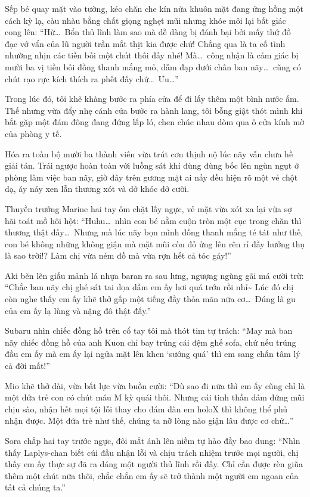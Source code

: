\documentclass[../main.tex]{subfiles}
\begin{document}
Sếp bé quay mặt vào tường, kéo chăn che kín nửa khuôn mặt đang ửng hồng một cách kỳ lạ, càu nhàu bằng chất giọng nghẹt mũi nhưng khóe môi lại bất giác cong lên: ``Hừ\dots\ Bổn thủ lĩnh làm sao mà dễ dàng bị đánh bại bởi mấy thứ đồ đạc vớ vẩn của lũ người trần mắt thịt kia được chứ! Chẳng qua là ta cố tình nhường nhịn các tiền bối một chút thôi đấy nhé! Mà\dots\ công nhận là cảm giác bị mười ba vị tiền bối đồng thanh mắng mỏ, dẫm đạp dưới chân ban nãy\dots\ cũng có chút rạo rực kích thích ra phết đấy chứ\dots\ Ưu\dots''

Trong lúc đó, tôi khẽ khàng bước ra phía cửa để đi lấy thêm một bình nước ấm. Thế nhưng vừa đẩy nhẹ cánh cửa bước ra hành lang, tôi bỗng giật thót mình khi bắt gặp một đám đông đang đứng lấp ló, chen chúc nhau dòm qua ô cửa kính mờ của phòng y tế.

Hóa ra toàn bộ mười ba thành viên vừa trút cơn thịnh nộ lúc nãy vẫn chưa hề giải tán. Trái ngược hoàn toàn với luồng sát khí đùng đùng bốc lên ngùn ngụt ở phòng làm việc ban nãy, giờ đây trên gương mặt ai nấy đều hiện rõ một vẻ chột dạ, áy náy xen lẫn thương xót và dở khóc dở cười.

Thuyền trưởng Marine hai tay ôm chặt lấy ngực, vẻ mặt vừa xót xa lại vừa sợ hãi toát mồ hôi hột: ``Huhu\dots\ nhìn con bé nằm cuộn tròn một cục trong chăn thì thương thật đấy\dots\ Nhưng mà lúc nãy bọn mình đồng thanh mắng té tát như thế, con bé không những không giận mà mặt mũi còn đỏ ửng lên rên rỉ đầy hưởng thụ là sao trời!? Làm chị vừa ném đồ mà vừa rợn hết cả tóc gáy!''

Aki bẽn lẽn giấu mảnh lá nhựa baran ra sau lưng, ngượng ngùng gãi má cười trừ: ``Chắc ban nãy chị ghé sát tai dọa dẫm em ấy hơi quá trớn rồi nhỉ\~{} Lúc đó chị còn nghe thấy em ấy khẽ thở gấp một tiếng đầy thỏa mãn nữa cơ\dots\ Đúng là gu của em ấy lạ lùng và nặng đô thật đấy.''

Subaru nhìn chiếc đồng hồ trên cổ tay tôi mà thót tim tự trách: ``May mà ban nãy chiếc đồng hồ của anh Kuon chỉ bay trúng cái đệm ghế sofa, chứ nếu trúng đầu em ấy mà em ấy lại ngửa mặt lên khen `sướng quá' thì em sang chấn tâm lý cả đời mất!''

Mio khẽ thở dài, vừa bất lực vừa buồn cười: ``Dù sao đi nữa thì em ấy cũng chỉ là một đứa trẻ con có chút máu M kỳ quái thôi. Nhưng cái tinh thần dám đứng mũi chịu sào, nhận hết mọi tội lỗi thay cho đám đàn em holoX thì không thể phủ nhận được. Một đứa trẻ như thế, chúng ta nỡ lòng nào giận lâu được cơ chứ\dots''

Sora chắp hai tay trước ngực, đôi mắt ánh lên niềm tự hào đầy bao dung: ``Nhìn thấy Laplys-chan biết cúi đầu nhận lỗi và chịu trách nhiệm trước mọi người, chị thấy em ấy thực sự đã ra dáng một người thủ lĩnh rồi đấy. Chỉ cần được rèn giũa thêm một chút nữa thôi, chắc chắn em ấy sẽ trở thành một người em ngoan của tất cả chúng ta.''
\end{document}

